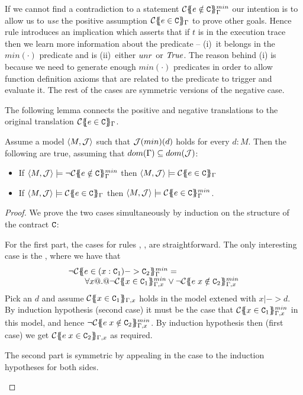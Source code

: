 If we cannot find a contradiction to a statement $\ctransmin{}{\Gamma}{e \notin \Ct}$ our intention is to allow  
us to {\em use} the positive assumption $\ctrans{}{\Gamma}{e \in \Ct}$ to prove other goals. Hence rule  
introduces an implication which asserts that if $t$ is in the execution trace then we learn more information about 
the predicate -- (i)~it belongs in the $min(\cdot)$ predicate and is (ii)~either $\unr$ or $\True$. The reason behind
(i) is because we need to generate enough $min(\cdot)$ predicates in order to allow function definition axioms that 
are related to the predicate to trigger and evaluate it. The rest of the cases are symmetric versions of the negative
case. 

The following lemma connects the positive and negative translations to the original translation $\ctrans{}{\Gamma}{e \in \Ct}$. 

\begin{lemma}\label{lem:contract-min} Assume a model $\langle M,\calI\rangle$ such that $\calI(min)(d)$ holds for every $d : M$. Then 
the following are true, assuming that $dom(\Gamma) \subseteq dom(\calI)$:
\begin{itemize} 
  \item If $\langle M,\calI\rangle \models \neg \ctransmin{}{\Gamma}{e \notin \Ct}$ then $\langle M,\calI\rangle\models \ctrans{}{\Gamma}{e \in \Ct}$
  \item If $\langle M,\calI\rangle \models \ctrans{}{\Gamma}{e \in \Ct}$ then $\langle M,\calI\rangle \models \ctransmin{}{\Gamma}{e \in \Ct}$.
\end{itemize}
\end{lemma}
\begin{proof} We prove the two cases simultaneously by induction on the structure of the contract $\Ct$:
\begin{itemize*}
  \item For the first part, the cases for rules , ,  are straightforward. The only 
        interesting case is the , where we have that 
        \[\begin{array}{l}
             \neg \ctransmin{}{\Gamma}{e \in (x : \Ct_1) -> \Ct_2}  = \\ 
             \quad\quad \forall x @.@ \neg \ctransmin{}{\Gamma,x}{x \in \Ct_1} \lor \neg \ctransmin{}{\Gamma,x}{e\;x \notin \Ct_2}
        \end{array}\]
        Pick an $d$ and assume $\ctrans{}{\Gamma,x}{x \in \Ct_1}$ holds in the model extened with $x |-> d$. 
        By induction hypothesis (second case) it must be the case that $\ctransmin{}{\Gamma,x}{x \in \Ct_1}$ in this model, and hence $\neg \ctransmin{}{\Gamma,x}{e\;x \notin \Ct_2}$.
        By induction hypothesis then (first case) we get $\ctrans{}{\Gamma,x}{e\;x \in \Ct_2}$ as required.
  \item The second part is symmetric by appealing in the  case to the induction hypotheses for both sides.
\end{itemize*} 
\end{proof}

